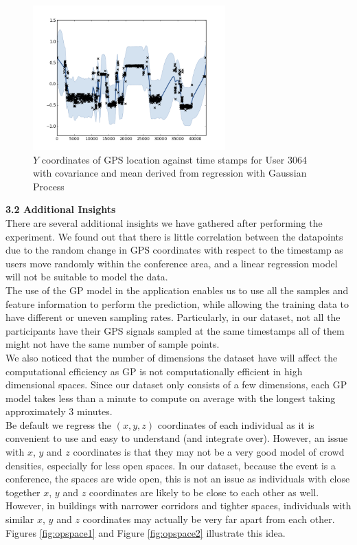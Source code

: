 \documentclass[letterpaper]{article}
\begin{document}
\begin{figure}[h!]
  \centering
    \includegraphics[width=280px,natwidth=634,natheight=442]{selected_GP/3064.csv_Y.png}
  \caption{$Y$ coordinates of GPS location against time stamps for User 3064 with covariance and mean derived from regression with Gaussian Process}
  \label{fig:GP2}
\end{figure}

{\bf3.2  Additional Insights} \\

There are several additional insights we have gathered after performing the experiment. We found out that there is little correlation between the datapoints due to the random change in GPS coordinates with respect to the timestamp as users move randomly within the conference area, and a linear regression model will not be suitable to model the data. \\

The use of the GP model in the application enables us to use all the samples and feature information to perform the prediction, while allowing the training data to have different or uneven sampling rates. Particularly, in our dataset, not all the participants have their GPS signals sampled at the same timestamps all of them might not have the same number of sample points. \\

We also noticed that the number of dimensions the dataset have will affect the computational efficiency as GP is not computationally efficient in high dimensional spaces. Since our dataset only consists of a few dimensions, each GP model takes less than a minute to compute on average with the longest taking approximately 3 minutes.\\

Be default we regress the $(x,y,z)$ coordinates of each individual as it is convenient to use and easy to understand (and integrate over). However, an issue with $x$, $y$ and $z$ coordinates is that they may not be a very good model of crowd densities, especially for less open spaces. In our dataset, because the event is a conference, the spaces are wide open, this is not an issue as individuals with close together $x$, $y$ and $z$ coordinates are likely to be close to each other as well. However, in buildings with narrower corridors and tighter spaces, individuals with similar $x$, $y$ and $z$ coordinates may actually be very far apart from each other. Figures \ref{fig:opspace1} and Figure \ref{fig:opspace2} illustrate this idea.
\end{document}
